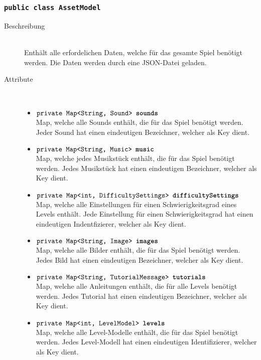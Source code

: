 \subsubsection{\normalfont \texttt{public class \textbf{AssetModel}}}

\begin{description}
\item[Beschreibung] \hfill \\ Enthält alle erfordelichen Daten, welche für das gesamte Spiel benötigt werden. Die Daten werden durch eine JSON-Datei geladen.
\item[Attribute] \hfill \\
	\vspace{-.8cm}
	\begin{itemize}	
		\item $\texttt{private Map<String, Sound> \textbf{sounds}}$ \\ Map, welche alle Sounds enthält, die für das Spiel benötigt werden. Jeder Sound hat einen eindeutigen Bezeichner, welcher als Key dient.
		\item $\texttt{private Map<String, Music> \textbf{music}}$ \\ Map, welche jedes Musikstück enthält, die für das Spiel benötigt werden. Jedes Musikstück hat einen eindeutigen Bezeichner, welcher als Key dient.
		\item $\texttt{private Map<int, DifficultySettings> \textbf{difficultySettings}}$ \\ Map, welche alle Einstellungen für einen Schwierigkeitsgrad eines Levels enthält. Jede Einstellung für einen Schwierigkeitsgrad hat einen eindeutigen Indentfizierer, welcher als Key dient.
		\item $\texttt{private Map<String, Image> \textbf{images}}$ \\ Map, welche alle Bilder enthält, die für das Spiel benötigt werden. Jedes Bild hat einen eindeutigen Bezeichner, welcher als Key dient.
		\item $\texttt{private Map<String, TutorialMessage> \textbf{tutorials}}$ \\ Map, welche alle Anleitungen enthält, die für alle Levels benötigt werden. Jedes Tutorial hat einen eindeutigen Bezeichner, welcher als Key dient.
		\item $\texttt{private Map<int, LevelModel> \textbf{levels}}$ \\ Map, welche alle Level-Modelle enthält, die für das Spiel benötigt werden. Jedes Level-Modell hat einen eindeutigen Identifizierer, welcher als Key dient.


\end{itemize}
\end{description}
